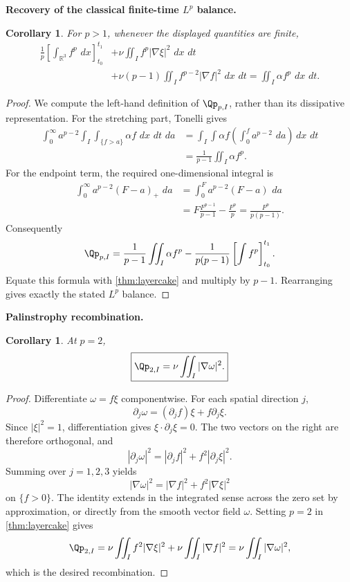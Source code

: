 \documentclass[11pt]{article}
\newtheorem{corollary}[theorem]{Corollary}
\theoremstyle{definition}\newtheorem{definition}[theorem]{Definition}
\theoremstyle{remark}\newtheorem{remark}[theorem]{Remark}
\newcommand{\R}{\mathbb R}\newcommand{\dd}{\,d}\newcommand{\HH}{\mathcal H}
\begin{document}
\medskip
\noindent\textbf{Recovery of the classical finite-time $L^p$ balance.}
\begin{corollary}\label{cor:classical-lp}
For $p>1$, whenever the displayed quantities are finite,
\[
\boxed{
\begin{aligned}
\frac1p\left[\int_{\R^3}f^p\,\dd x\right]_{t_0}^{t_1}
&+\nu\iint_I f^p|\nabla\xi|^2\,\dd x\,\dd t\\
&+\nu(p-1)\iint_I f^{p-2}|\nabla f|^2\,\dd x\,\dd t
=\iint_I\alpha f^p\,\dd x\,\dd t.
\end{aligned}}
\]
\end{corollary}
\begin{proof}
We compute the left-hand definition of $\Qp_{p,I}$, rather than its
dissipative representation.  For the stretching part, Tonelli gives
\[
\begin{aligned}
\int_0^\infty a^{p-2}
\int_I\int_{\{f>a\}}\alpha f\,\dd x\,\dd t\,\dd a
&=\int_I\int\alpha f
\left(\int_0^f a^{p-2}\,\dd a\right)\dd x\,\dd t\\
&=\frac1{p-1}\iint_I\alpha f^p.
\end{aligned}
\]
For the endpoint term, the required one-dimensional integral is
\[
\begin{aligned}
\int_0^\infty a^{p-2}(F-a)_+\,\dd a
&=\int_0^F a^{p-2}(F-a)\,\dd a\\
&=F\frac{F^{p-1}}{p-1}-\frac{F^p}{p}
=\frac{F^p}{p(p-1)}.
\end{aligned}
\]
Consequently
\[
\Qp_{p,I}
=\frac1{p-1}\iint_I\alpha f^p
-\frac1{p(p-1)}
\left[\int f^p\right]_{t_0}^{t_1}.
\]
Equate this formula with \cref{thm:layercake} and multiply by $p-1$.
Rearranging gives exactly the stated $L^p$ balance.
\end{proof}

\medskip
\noindent\textbf{Palinstrophy recombination.}
\begin{corollary}\label{cor:pal}
At $p=2$,
\[
\boxed{\Qp_{2,I}=\nu\iint_I|\nabla\omega|^2.}
\]
\end{corollary}
\begin{proof}
Differentiate $\omega=f\xi$ componentwise.  For each spatial direction $j$,
\[
\partial_j\omega=(\partial_jf)\xi+f\partial_j\xi.
\]
Since $|\xi|^2=1$, differentiation gives
$\xi\cdot\partial_j\xi=0$.  The two vectors on the right are therefore
orthogonal, and
\[
|\partial_j\omega|^2
=|\partial_jf|^2+f^2|\partial_j\xi|^2.
\]
Summing over $j=1,2,3$ yields
\[
|\nabla\omega|^2=|\nabla f|^2+f^2|\nabla\xi|^2
\]
on $\{f>0\}$.  The identity extends in the integrated sense across the zero
set by approximation, or directly from the smooth vector field $\omega$.
Setting $p=2$ in \cref{thm:layercake} gives
\[
\Qp_{2,I}
=\nu\iint_I f^2|\nabla\xi|^2
+\nu\iint_I|\nabla f|^2
=\nu\iint_I|\nabla\omega|^2,
\]
which is the desired recombination.
\end{proof}
\end{document}
